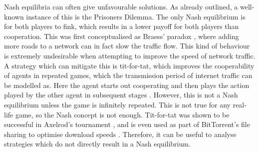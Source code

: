 \documentclass{article}
\begin{document}
Nash equilibria can often give unfavourable solutions. As already outlined, a well-known instance of this is the Prisoners Dilemma. The only Nash equilibrium is for both players to fink, which results in a lower payoff for both players than cooperation. This was first conceptualised as Braess’ paradox \cite{braess_paradox_2005}, where adding more roads to a network can in fact slow the traffic flow. This kind of behaviour is extremely undesirable when attempting to improve the speed of network traffic. A strategy which can mitigate this is tit-for-tat, which improves the cooperability of agents in repeated games, which the transmission period of internet traffic can be modelled as. Here the agent starts out cooperating and then plays the action played by the other agent in subsequent stages \cite{beyond_nash}. However, this is not a Nash equilibrium unless the game is infinitely repeated. This is not true for any real-life game, so the Nash concept is not enough. Tit-for-tat was shown to be successful in Axelrod’s tournament \cite{alexrod}, and is even used as part of BitTorrent’s file sharing to optimise download speeds \cite{cohen_incentives_2003}. Therefore, it can be useful to analyse strategies which do not directly result in a Nash equilibrium.



\printbibliography
\end{document}
